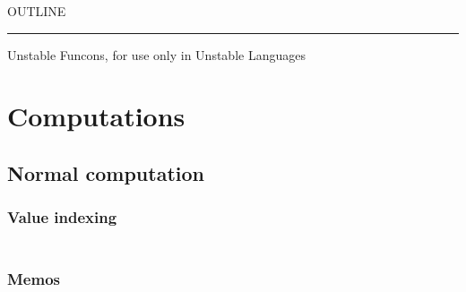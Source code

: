 


    OUTLINE
  \tableofcontents
\begin{center}
\rule{3in}{0.4pt}
\end{center}

Unstable Funcons, for use only in Unstable Languages

\section{Computations}\hypertarget{computations}{}\label{computations}

\subsection{Normal computation}\hypertarget{normal-computation}{}\label{normal-computation}

\subsubsection{Value indexing}\hypertarget{value-indexing}{}\label{value-indexing}

\begin{align*}
  [ \
  \KEY{Entity} \quad & \NAMEHYPER{../Computations/Normal}{Indexing}{value-index} \\
  \KEY{Funcon} \quad & \NAMEHYPER{../Computations/Normal}{Indexing}{initialise-index} \\
  \KEY{Funcon} \quad & \NAMEHYPER{../Computations/Normal}{Indexing}{allocate-index} \\
  \KEY{Funcon} \quad & \NAMEHYPER{../Computations/Normal}{Indexing}{lookup-index}
  \ ]
\end{align*}
\subsubsection{Memos}\hypertarget{memos}{}\label{memos}

\begin{align*}
  [ \
  \KEY{Entity} \quad & \NAMEHYPER{../Computations/Normal}{Memos}{memo-map} \\
  \KEY{Funcon} \quad & \NAMEHYPER{../Computations/Normal}{Memos}{initialise-memos} \\
  \KEY{Funcon} \quad & \NAMEHYPER{../Computations/Normal}{Memos}{memo-value} \\
  \KEY{Funcon} \quad & \NAMEHYPER{../Computations/Normal}{Memos}{initialise-memo-value} \\
  \KEY{Funcon} \quad & \NAMEHYPER{../Computations/Normal}{Memos}{memo-value-recall}
  \ ]
\end{align*}

